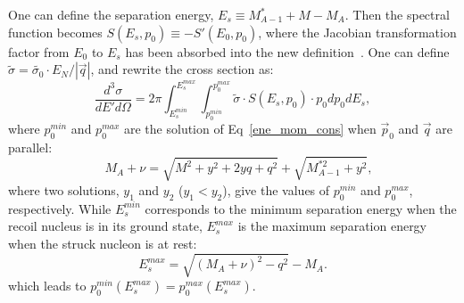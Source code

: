 One can define the separation energy, $E_{s}\equiv M_{A-1}^{*}+M-M_{A}$. Then the spectral function becomes $S(E_{s},p_{0})\equiv - S'(E_{0},p_{0})$, where the Jacobian transformation factor from $E_{0}$ to $E_{s}$ has been absorbed into the new definition~\cite{john_thesis}. One can define $\tilde{\sigma}=\tilde{\sigma_{0}}\cdot E_{N}/|\vec{q}|$, and rewrite the cross section as:
\begin{equation}
  \frac{d^{3}\sigma}{dE'd\Omega} = 2\pi \int_{E_{s}^{min}}^{E_{s}^{max}} \int_{p_{0}^{min}}^{p_{0}^{max}}\tilde{\sigma}\cdot S(E_{s},p_{0})\cdot p_{0}dp_{0}dE_{s},
  \label{in_qe_xs1}
\end{equation}
where $p_{0}^{min}$ and $p_{0}^{max}$ are the solution of Eq~\eqref{ene_mom_cons} when $\vec{p}_{0}$ and $\vec{q}$ are parallel:
\begin{equation}
  \quad  M_{A}+\nu = \sqrt{M^{2}+y^{2}+2yq+q^{2}}+\sqrt{M_{A-1}^{*2}+y^{2}},
  \label{ene_mom_cons_y}
\end{equation}	
where two solutions, $y_{1}$ and $y_{2}$ ($y_{1}<y_{2}$), give the values of $p_{0}^{min}$ and $p_{0}^{max}$, respectively. While $E_{s}^{min}$ corresponds to the minimum separation energy when the recoil nucleus is in its ground state, $E_{s}^{max}$ is the maximum separation energy when the struck nucleon is at rest:
\begin{equation}
  E_{s}^{max}=\sqrt{(M_{A}+\nu)^{2}-q^{2}}-M_{A}.
\end{equation}
which leads to $p_{0}^{min}(E_{s}^{max}) = p_{0}^{max}(E_{s}^{max})$.

